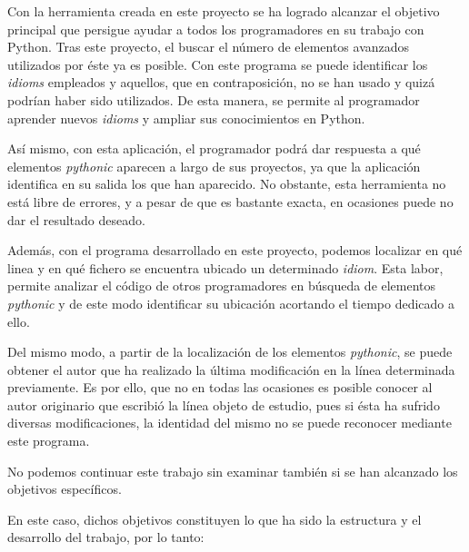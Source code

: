 \documentclass[a4paper, 12pt]{book}
\begin{document}
Con la herramienta creada en este proyecto se ha logrado alcanzar el objetivo principal que persigue ayudar a todos los programadores en su trabajo con Python. Tras este proyecto, el buscar el número de elementos avanzados utilizados por éste ya es posible. Con este programa se puede identificar los \textit{idioms} empleados y aquellos, que en contraposición, no se han usado y quizá podrían haber sido utilizados. De esta manera, se permite al programador aprender nuevos \textit{idioms} y ampliar sus conocimientos en Python.

Así mismo, con esta aplicación, el programador podrá dar respuesta a qué elementos \textit{pythonic} aparecen a largo de sus proyectos, ya que la aplicación identifica en su salida los que han aparecido. No obstante, esta herramienta no está libre de errores, y a pesar de que es bastante exacta, en ocasiones puede no dar el resultado deseado.

Además, con el programa desarrollado en este proyecto, podemos localizar en qué linea y en qué fichero se encuentra ubicado un determinado \textit{idiom}. Esta labor, permite analizar el código de otros programadores en búsqueda de elementos \textit{pythonic} y de este modo identificar su ubicación acortando el tiempo dedicado a ello.

Del mismo modo, a partir de la localización de los elementos \textit{pythonic}, se puede obtener el autor que ha realizado la última modificación en la línea determinada previamente. Es por ello, que no en todas las ocasiones es posible conocer al autor originario que escribió la línea objeto de estudio, pues si ésta ha sufrido diversas modificaciones, la identidad del mismo no se puede reconocer mediante este programa.

No podemos continuar este trabajo sin examinar también si se han alcanzado los objetivos específicos.

En este caso, dichos objetivos constituyen lo que ha sido la estructura y el desarrollo del trabajo, por lo tanto:
\end{document}
